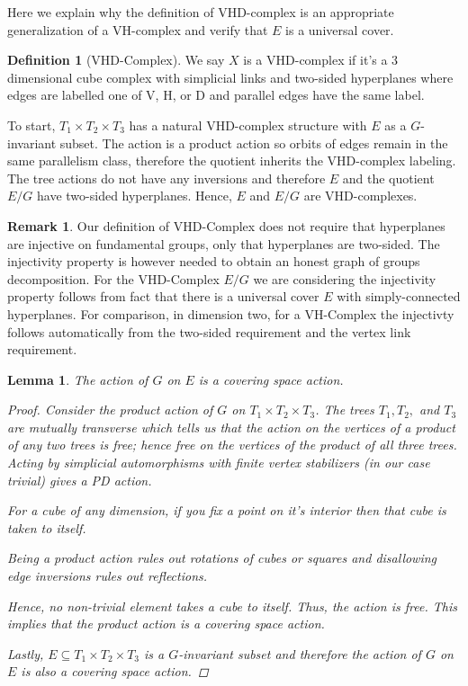 \documentclass[12pt,parskip=full]{report}
\theoremstyle{plain}
\newtheorem{lem}[thm]{Lemma}
\theoremstyle{definition}
\newtheorem{rmk}[thm]{Remark}
\newtheorem{dfn}[thm]{Definition}
\begin{document}
Here we explain why the definition of VHD-complex is an appropriate generalization of a VH-complex and verify that \(E\) is a universal cover.

\begin{dfn}
    [VHD-Complex]
    \label{dfn:vhd}
    We say \(X\) is a VHD-complex if it's a 3 dimensional cube complex with simplicial links and two-sided hyperplanes where edges are labelled one of V, H, or D and parallel edges have the same label.
\end{dfn}

To start, \(T_1\times T_2\times T_3\) has a natural VHD-complex structure with \(E\) as a \(G\)-invariant subset. The action is a product action so orbits of edges remain in the same parallelism class, therefore the quotient inherits the VHD-complex labeling. The tree actions do not have any inversions and therefore \(E\) and the quotient \(E/G\) have two-sided hyperplanes. Hence, \(E\) and \(E/G\) are VHD-complexes.


\begin{rmk}
    Our definition of VHD-Complex does not require that hyperplanes are injective on fundamental groups, only that hyperplanes are two-sided. The injectivity property is  however needed to obtain an honest graph of groups decomposition. For the VHD-Complex \(E/G\) we are considering the injectivity property follows from fact that there is a universal cover \(E\) with simply-connected hyperplanes. For comparison, in dimension two, for a VH-Complex the injectivty follows automatically from the two-sided requirement and the vertex link requirement.
\end{rmk}

\begin{lem}

    The action of \(G\) on \(E\) is a covering space action.
    
    \begin{proof}
        Consider the product action of \(G\) on \(T_1\times T_2\times T_3\). 
        The trees \(T_1, T_2,\) and \(T_3\) are mutually transverse which tells us that the action on the vertices of a product of any two trees is free; hence free on the vertices of the product of all three trees. Acting by simplicial automorphisms with finite vertex stabilizers (in our case trivial) gives a PD action. 
        
        For a cube of any dimension, if you fix a point on it's interior then that cube is taken to itself.
        
        Being a product action rules out rotations of cubes or squares and disallowing edge inversions rules out reflections.
        
        Hence, no non-trivial element takes a cube to itself. Thus, the action is free. This implies that the product action is a covering space action.
        
        Lastly, \(E\subseteq T_1\times T_2\times T_3\) is a \(G\)-invariant subset and therefore the action of \(G\) on \(E\) is also a covering space action.
    \end{proof}
\end{lem}
\end{document}
